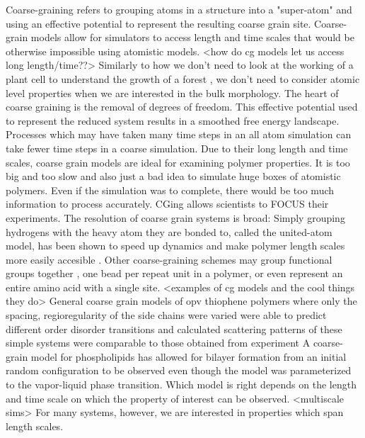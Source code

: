 Coarse-graining refers to grouping atoms in a structure into a "super-atom" and using an effective potential to represent the resulting coarse grain site.
Coarse-grain models allow for simulators to access length and time scales that would be otherwise impossible using atomistic models.
<how do cg models let us access long length/time??>
Similarly to how we don't need to look at the working of a plant cell to understand the growth of a forest \cite{Muller-Plathe2002}, we don't need to consider atomic level properties when we are interested in the bulk morphology.
The heart of coarse graining is the removal of degrees of freedom. 
This effective potential used to represent the reduced system results in a smoothed free energy landscape. 
Processes which may have taken many time steps in an all atom simulation can take fewer time steps in a coarse simulation.\cite{Berendsen2010}
Due to their long length and time scales, coarse grain models are ideal for examining polymer properties.\cite{Gartner2019a}
It is too big and too slow and also just a bad idea to simulate huge boxes of atomistic polymers.
Even if the simulation was to complete, there would be too much information to process accurately. 
CGing allows scientists to FOCUS their experiments.\cite{Baschnagel2000}
The resolution of coarse grain systems is broad:
Simply grouping hydrogens with the heavy atom they are bonded to, called the united-atom model, has been shown to speed up dynamics and make polymer length scales more easily accesible \cite{Paul1995a, Yang2006a,}.
Other coarse-graining schemes may group functional groups together \cite{Berendsen2010, Jankowski2013, Marsh2014}, one bead per repeat unit in a polymer\cite{Lee2011}, or even represent an entire amino acid with a single site\cite{Peng2019a}.
<examples of cg models and the cool things they do>
General coarse grain models of opv thiophene polymers where only the spacing, regioregularity of the side chains were varied were able to predict different order disorder transitions and calculated scattering patterns of these simple systems were comparable to those obtained from experiment \cite{Jankowski2013, Marsh2014} 
A coarse-grain model for phospholipids has allowed for bilayer formation from an initial random configuration to be observed even though the model was parameterized to the vapor-liquid phase transition.\cite{Shelley2001}
Which model is right depends on the length and time scale on which the property of interest can be observed.
<multiscale sims>
For many systems, however, we are interested in properties which span length scales.
